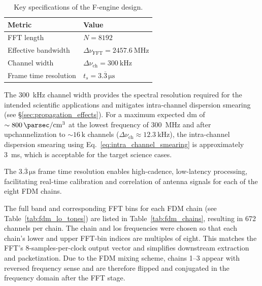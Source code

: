 \begin{table}[t]
\centering
\caption[F-engine specifications]{Key specifications of the F-engine design.}
\begin{tabular}{l l}
\toprule
\textbf{Metric} & \textbf{Value} \\
\midrule
FFT length & $N=8192$ \\
Effective bandwidth & $\Delta\nu_\text{FFT}=\SI{2457.6}{\mega\hertz}$ \\
Channel width & $\Delta\nu_\text{ch}=\SI{300}{\kilo\hertz}$ \\
Frame time resolution & $t_s=3.\overline{3}\,\unit{\micro\second}$ \\
\bottomrule
\end{tabular}
\label{tab:f_engine_metrics}
\end{table}

The \SI{300}{\kilo\hertz} channel width provides the spectral resolution required for the intended scientific applications and mitigates intra-channel dispersion smearing (see \S\ref{sec:propagation_effects}). For a maximum expected \gls{dm} of $\sim\SI{800}{\parsec \per \centi \meter \cubed}$ at the lowest frequency of \SI{300}{\mega\hertz} and after upchannelization to $\sim16\,\text{k}$ channels ($\Delta \nu_\text{ch} \approx \SI{12.3}{\kilo\hertz}$), the intra-channel dispersion smearing using Eq.\ \ref{eq:intra_channel_smearing} is approximately \SI{3}{\milli\second}, which is acceptable for the target science cases.

The $3.\overline{3}\,\unit{\micro\second}$ frame time resolution enables high-cadence, low-latency processing, facilitating real-time calibration and correlation of antenna signals for each of the eight FDM chains.

The full band and corresponding FFT bins for each FDM chain (see Table~\ref{tab:fdm_lo_tones}) are listed in Table~\ref{tab:fdm_chains}, resulting in \num{672} channels per chain. The chain and \glspl{lo} frequencies were chosen so that each chain’s lower and upper FFT-bin indices are multiples of eight. This matches the FFT’s 8-samples-per-clock output vector and simplifies downstream extraction and packetization. Due to the FDM mixing scheme, chains 1--3 appear with reversed frequency sense and are therefore flipped and conjugated in the frequency domain after the FFT stage.

